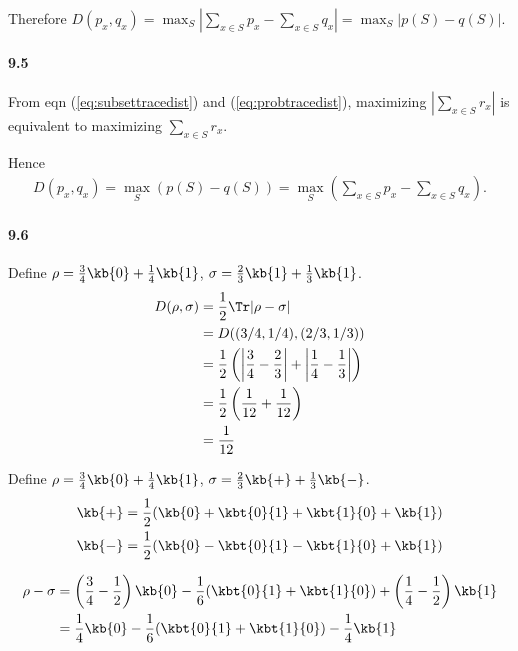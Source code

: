 Therefore $D(p_x, q_x) = \max_S \left|\sum_{x \in S} p_x - \sum_{x \in S}q_x \right| = \max_S |p(S) - q(S)|$.

\paragraph{9.5}
From eqn (\ref{eq:subsettracedist}) and (\ref{eq:probtracedist}), maximizing $\left|\sum_{x \in S} r_x \right|$ is equivalent to
maximizing $\sum_{x \in S} r_x$.

Hence
\begin{align*}
	D(p_x, q_x) = \max_S (p(S) - q(S)) = \max_S \left(\sum_{x \in S} p_x - \sum_{x \in S}q_x \right).
\end{align*}



\paragraph{9.6}

Define $\rho = \frac{3}{4}\kb{0} + \frac{1}{4}\kb{1}$, $\sigma = \frac{2}{3} \kb{1} + \frac{1}{3}\kb{1}$.
\begin{align*}
	D(\rho, \sigma) &= \frac{1}{2} \Tr |\rho - \sigma|\\
		&= D((3/4, 1/4), (2/3, 1/3))\\
		&= \frac{1}{2} \left(\left| \frac{3}{4} - \frac{2}{3}  \right| +\left| \frac{1}{4} - \frac{1}{3} \right| \right)\\
		&= \frac{1}{2} \left( \frac{1}{12} + \frac{1}{12} \right)\\
		&= \frac{1}{12}
\end{align*}


Define $\rho = \frac{3}{4}\kb{0} + \frac{1}{4}\kb{1}$, $\sigma = \frac{2}{3} \kb{+} + \frac{1}{3}\kb{-}$.
\begin{align*}
	\kb{+} &= \frac{1}{2} (\kb{0} + \kbt{0}{1} + \kbt{1}{0} + \kb{1})\\
	\kb{-} &= \frac{1}{2} (\kb{0} - \kbt{0}{1} - \kbt{1}{0} + \kb{1})
\end{align*}

\begin{align*}
	\rho - \sigma &= \left(\frac{3}{4} - \frac{1}{2}\right) \kb{0} - \frac{1}{6} (\kbt{0}{1} + \kbt{1}{0}) + \left(\frac{1}{4} - \frac{1}{2}\right) \kb{1}\\
		&= \frac{1}{4} \kb{0} - \frac{1}{6} (\kbt{0}{1} + \kbt{1}{0}) - \frac{1}{4} \kb{1}\\
\end{align*}

